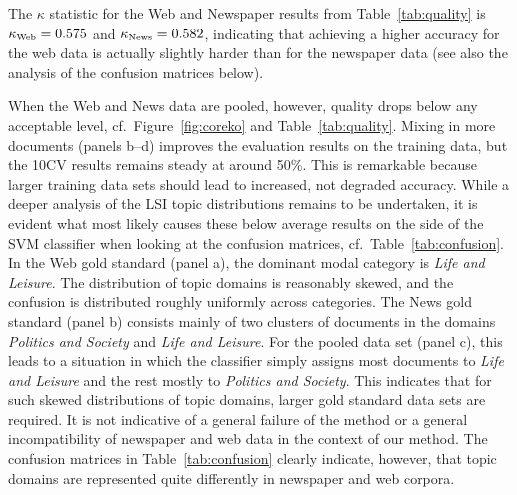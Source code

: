 \documentclass[11pt]{article}
\begin{document}
The $\kappa$ statistic for the Web and Newspaper results from Table~\ref{tab:quality} is $\kappa_{\textrm{\tiny Web}}=0.575$ and $\kappa_{\textrm{\tiny News}}=0.582$, indicating that achieving a higher accuracy for the web data is actually slightly harder than for the newspaper data (see also the analysis of the confusion matrices below).

When the Web and News data are pooled, however, quality drops below any acceptable level, cf.\ Figure~\ref{fig:coreko} and Table~\ref{tab:quality}.
Mixing in more documents (panels b--d) improves the evaluation results on the training data, but the 10CV results remains steady at around 50\%.
This is remarkable because larger training data sets should lead to increased, not degraded accuracy.
While a deeper analysis of the LSI topic distributions remains to be undertaken, it is evident what most likely causes these below average results on the side of the SVM classifier when looking at the confusion matrices, cf.\ Table~\ref{tab:confusion}.
In the Web gold standard (panel a), the dominant modal category is \textit{Life and Leisure}.
The distribution of topic domains is reasonably skewed, and the confusion is distributed roughly uniformly across categories.
The News gold standard (panel b) consists mainly of two clusters of documents in the domains \textit{Politics and Society} and \textit{Life and Leisure}.
For the pooled data set (panel c), this leads to a situation in which the classifier simply assigns most documents to \textit{Life and Leisure} and the rest mostly to \textit{Politics and Society}.
This indicates that for such skewed distributions of topic domains, larger gold standard data sets are required.
It is not indicative of a general failure of the method or a general incompatibility of newspaper and web data in the context of our method.
The confusion matrices in Table~\ref{tab:confusion} clearly indicate, however, that topic domains are represented quite differently in newspaper and web corpora.
\end{document}
